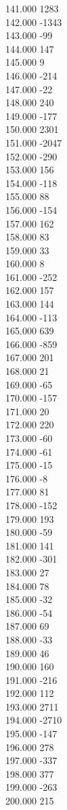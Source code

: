 { 141.000	1283 \\
 142.000	-1343 \\
 143.000	-99 \\
 144.000	147 \\
 145.000	9 \\
 146.000	-214 \\
 147.000	-22 \\
 148.000	240 \\
 149.000	-177 \\
 150.000	2301 \\
 151.000	-2047 \\
 152.000	-290 \\
 153.000	156 \\
 154.000	-118 \\
 155.000	88 \\
 156.000	-154 \\
 157.000	162 \\
 158.000	83 \\
 159.000	33 \\
 160.000	8 \\
 161.000	-252 \\
 162.000	157 \\
 163.000	144 \\
 164.000	-113 \\
 165.000	639 \\
 166.000	-859 \\
 167.000	201 \\
 168.000	21 \\
 169.000	-65 \\
 170.000	-157 \\
 171.000	20 \\
 172.000	220 \\
 173.000	-60 \\
 174.000	-61 \\
 175.000	-15 \\
 176.000	-8 \\
 177.000	81 \\
 178.000	-152 \\
 179.000	193 \\
 180.000	-59 \\
 181.000	141 \\
 182.000	-301 \\
 183.000	27 \\
 184.000	78 \\
 185.000	-32 \\
 186.000	-54 \\
 187.000	69 \\
 188.000	-33 \\
 189.000	46 \\
 190.000	160 \\
 191.000	-216 \\
 192.000	112 \\
 193.000	2711 \\
 194.000	-2710 \\
 195.000	-147 \\
 196.000	278 \\
 197.000	-337 \\
 198.000	377 \\
 199.000	-263 \\
 200.000	215 \\
}
